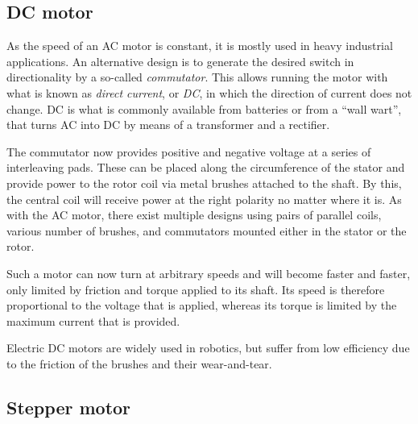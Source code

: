 \subsection{DC motor}

As the speed of an AC motor is constant, it is mostly used in heavy industrial applications. An alternative design is to generate the desired switch in directionality by a so-called \textsl{commutator}. This allows running the motor with what is known as \textsl{direct current}, or \textsl{DC}, in which the direction of current does not change. DC is what is commonly available from batteries or from a ``wall wart'', that turns AC into DC by means of a transformer and a rectifier.


The commutator now provides positive and negative voltage at a series of interleaving pads. These can be placed along the circumference of the stator and provide power to the rotor coil via metal brushes attached to the shaft. By this, the central coil will receive power at the right polarity no matter where it is. As with the AC motor, there exist multiple designs using pairs of parallel coils, various number of brushes, and commutators mounted either in the stator or the rotor.

Such a motor can now turn at arbitrary speeds and will become faster and faster, only limited by friction and torque applied to its shaft. Its speed is therefore proportional to the voltage that is applied, whereas its torque is limited by the maximum current that is provided.

Electric DC motors are widely used in robotics, but suffer from low efficiency due to the friction of the brushes and their wear-and-tear.

\subsection{Stepper motor}

